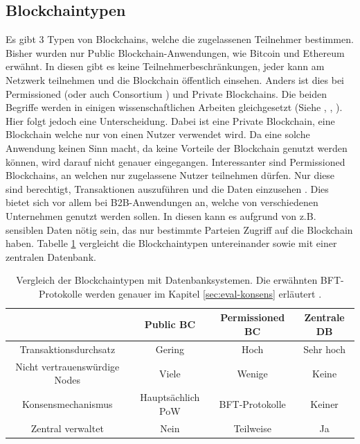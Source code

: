 \subsection{Blockchaintypen}
Es gibt 3 Typen von Blockchains, welche die zugelassenen Teilnehmer bestimmen. Bisher wurden nur Public Blockchain-Anwendungen, wie Bitcoin und Ethereum erwähnt. In diesen gibt es keine Teilnehmerbeschränkungen, jeder kann am Netzwerk teilnehmen und die Blockchain öffentlich einsehen. Anders ist dies bei Permissioned (oder auch Consortium \cite{BenHamidaBlockchainEnterpriseOverview2017}) und Private Blockchains. Die beiden Begriffe werden in einigen wissenschaftlichen Arbeiten gleichgesetzt (Siehe \cite{Gramolidangerprivateblockchains2016}, \cite{PongnumkulPerformanceAnalysisPrivate2017}, \cite{LiScalablePrivateIndustrial2017}). Hier folgt jedoch eine Unterscheidung. Dabei ist eine Private Blockchain, eine Blockchain welche nur von einen Nutzer verwendet wird. Da eine solche Anwendung keinen Sinn macht, da keine Vorteile der Blockchain genutzt werden können, wird darauf nicht genauer eingegangen. Interessanter sind Permissioned Blockchains, an welchen nur zugelassene Nutzer teilnehmen dürfen. Nur diese sind berechtigt, Transaktionen auszuführen und die Daten einzusehen \cite{LiScalablePrivateIndustrial2017}. Dies bietet sich vor allem bei B2B-Anwendungen an, welche von verschiedenen Unternehmen genutzt werden sollen. In diesen kann es aufgrund von z.B. sensiblen Daten nötig sein, das nur bestimmte Parteien Zugriff auf die Blockchain haben. Tabelle \ref{tab:bc-comparison} vergleicht die Blockchaintypen untereinander sowie mit einer zentralen Datenbank.

\begin{table}[h]
    \centering
	\begin{tabular}{c c c c}
	\textbf{} & \textbf{Public BC} & \textbf{Permissioned BC}  & \textbf{Zentrale DB} \\ \hline
	Transaktionsdurchsatz & Gering & Hoch & Sehr hoch \\ \hline
    Nicht vertrauenswürdige Nodes & Viele & Wenige & Keine \\ \hline
    Konsensmechanismus & Hauptsächlich PoW & BFT-Protokolle & Keiner \\ \hline
    Zentral verwaltet & Nein & Teilweise & Ja \\
    \end{tabular}
    \caption{Vergleich der Blockchaintypen mit Datenbanksystemen. Die erwähnten BFT-Protokolle werden genauer im Kapitel \ref{sec:eval-konsens} erläutert \cite{WustyouneedBlockchain2017}\cite{ZhengBlockchainChallengesOpportunities2017}.}
	\label{tab:bc-comparison}
\end{table}

